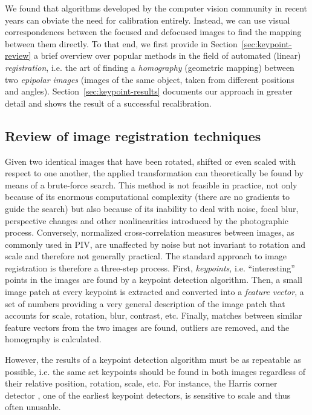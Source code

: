 \documentclass[11.5pt,oneside]{book}
\newcommand*{\secref}[1]{Section~\ref{#1}}
\begin{document}
We found that algorithms developed by the computer
vision community in recent years can obviate the need for calibration entirely.
Instead, we can use visual correspondences between the focused and defocused
images to find the mapping between them directly. To that end, we first provide
in \secref{sec:keypoint-review} a brief overview over popular methods in the field of automated (linear)
\emph{registration}, i.e. the art of finding a \emph{homography} (geometric
mapping) between two \emph{epipolar images} (images of the same object, taken
from different positions and angles). \secref{sec:keypoint-results} documents 
our approach in greater detail and shows the result of a successful
recalibration.

\subsection{Review of image registration techniques \label{sec:keypoint-review}} Given two
identical images that have been rotated, shifted or even scaled with respect to
one another, the applied transformation can theoretically be found by means of a
brute-force search. This method is not feasible in practice, not only because of
its enormous computational complexity (there are no gradients to guide the
search) but also because of its inability to deal with noise, focal blur,
perspective changes and other nonlinearities introduced by the photographic
process. Conversely, normalized cross-correlation measures between images, as
commonly used in PIV, are unaffected by noise but not invariant to rotation and
scale and therefore not generally practical. The standard approach to image
registration is therefore a three-step process. First, \emph{keypoints}, i.e.
``interesting'' points in the images are found by a keypoint detection
algorithm.  Then, a small image patch at every keypoint is extracted and
converted into a \emph{feature vector}, a set of numbers providing a very
general description of the image patch that accounts for scale, rotation, blur,
contrast, etc. Finally, matches between similar feature vectors from the two
images are found, outliers are removed, and the homography is calculated.

However, the results of a keypoint detection algorithm
must be as repeatable as possible, i.e. the same set keypoints should be found
in both images regardless of their relative position, rotation, scale, etc. 
For instance, the Harris corner detector \cite{Harris88}, one of the earliest
keypoint detectors, is sensitive to scale and thus often unusable.
\end{document}
